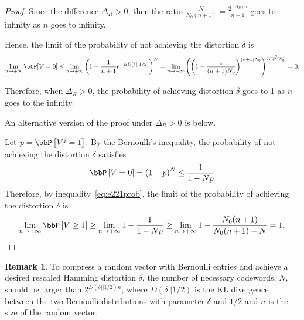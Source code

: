 \documentclass[11pt]{article}
\newcommand{\of}[1]{\left(#1\right)}
\newcommand{\off}[1]{\left[#1\right]}
\theoremstyle{plain}
\theoremstyle{definition}
\newtheorem{rmk}{Remark}
\begin{document}
\begin{proof}
 	Since the difference $\Delta_R > 0$, then the ratio $\frac{N}{N_0(n+1)} = \frac{2^{(\Delta_R) n} }{n+1}$ goes to infinity as $n$ goes to infinity. 
 	
 	 Hence, the limit of the probability of not achieving the distortion $\delta$ is
 	 \begin{equation}
 	 	\lim_{n \rightarrow +\infty} \bbP[V = 0] \leq \lim_{n \rightarrow +\infty} \of{1 - \frac{1}{n+1} e^{-nD(\delta || 1/2)}}^N = \lim_{n \rightarrow +\infty}\of{ \of{1 - \frac{1}{(n+1)N_0}}^{(n+1)N_0}}^{\frac{N}{(n+1)N_0}} = 0.
 	 \end{equation}
 	 
 	 Therefore, when $\Delta_R > 0$, the probability of achieving distortion $\delta$ goes to 1 as $n$ goes to the infinity. 
 	 
 	 \vspace{0.2cm}
 	 
 	 An alternative version of the proof under $\Delta_R > 0$ is below.
 	 
 	 \vspace{0.2cm}
 	 Let $p = \bbP \off{V^j = 1}$. By the Bernoulli's inequality, the probability of not achieving the distortion $\delta$ satisfies
 	 \begin{equation}
 	 	\bbP \off{V = 0} = \of{1 - p}^N \leq \frac{1}{1 - Np} 
 	 \end{equation}
 	  Therefore, by inequality~\eqref{eq:e221prob}, the limit of the probability of achieving the distortion $\delta$ is
 	  \begin{equation}
 	  	\lim_{n \rightarrow +\infty}  \bbP \off{V \geq 1} \geq \lim_{n \rightarrow +\infty}   1- \frac{1}{1- N p} \geq \lim_{n \rightarrow +\infty}  1 - \frac{N_0(n+1)}{N_0(n+1) - N } = 1.
 	  \end{equation}
 \end{proof}
 
 \begin{rmk}
 	To compress a random vector with Bernoulli entries and achieve a desired rescaled Hamming distortion $\delta$, the number of necessary codewords, $N$, should be larger than  $2^{D(\delta ||1/2) n}$, where $D(\delta ||1/2)$ is the KL divergence between the two Bernoulli distributions with parameter $\delta$ and $1/2$ and $n$ is the size of the random vector. 
 \end{rmk}
 
    
\end{document}
